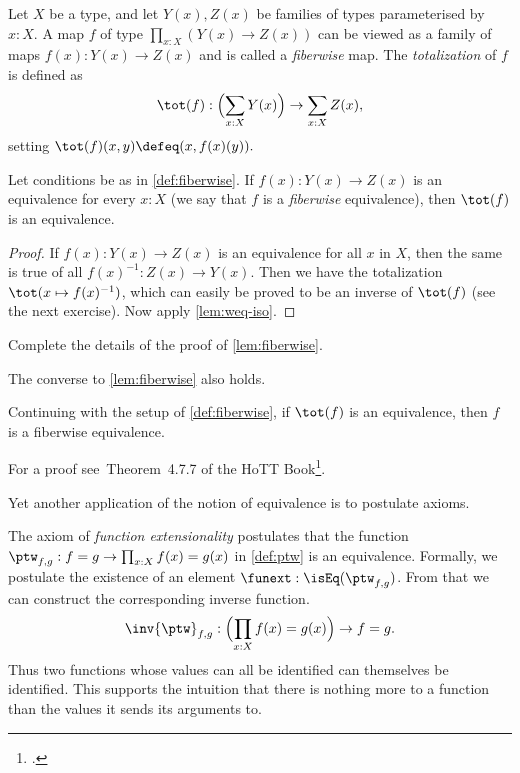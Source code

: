 \begin{definition}\label{def:fiberwise}
Let $X$ be a type, and let $Y(x),Z(x)$ be families of types parameterised
by $x:X$. A map $f$ of type $\prod_{x:X}(Y(x)\to Z(x))$
can be viewed as a family of maps $f(x): Y(x)\to Z(x)$ and is called a
\emph{fiberwise} map. The \emph{totalization} of $f$ is defined as
\[
  \tot(f) : \Bigl(\sum_{x:X} Y(x)\Bigr) \to \sum_{x:X} Z(x),
\]
setting $\tot(f)(x,y)\defeq (x,f(x)(y)).$
\end{definition}

\begin{lemma}\label{lem:fiberwise}
Let conditions be as in \cref{def:fiberwise}.
If $f(x): Y(x) \to Z(x)$ is an equivalence for every $x:X$
(we say that $f$ is a \emph{fiberwise} equivalence),
then $\tot(f)$ is an equivalence.
\end{lemma}

\begin{proof}
If $f(x): Y(x) \to Z(x)$ is an equivalence for all $x$ in $X$,
then the same is true of all $f(x)^{-1}: Z(x) \to Y(x)$.
Then we have the totalization $\tot(x\mapsto f(x)^{-1})$,
which can easily be proved to be an inverse of $\tot(f)$
(see the next exercise). Now apply \cref{lem:weq-iso}.
\end{proof}

\begin{xca}\label{xca:fiberwise}
Complete the details of the proof of \cref{lem:fiberwise}.
\end{xca}

The converse to \cref{lem:fiberwise} also holds.
\begin{lemma}\label{lem:fiberwise-equiv-from-tot}
  Continuing with the setup of \cref{def:fiberwise},
  if $\tot(f)$ is an equivalence, then $f$ is a fiberwise equivalence.
\end{lemma}
For a proof see~Theorem~4.7.7 of the HoTT Book\footcite{hottbook}.

Yet another application of the notion of equivalence is to postulate axioms.

\begin{principle}\label{def:funext}
The axiom of \emph{function extensionality} postulates that the function
$\ptw_{f,g}: f=g \to \prod_{x:X} f(x)=g(x)$ in \cref{def:ptw} is an equivalence.
Formally, we postulate the existence of an element $\funext : \isEq(\ptw_{f,g})$.
From that we can construct the corresponding inverse function.
\[
\inv{\ptw}_{f,g}: \Bigl(\prod_{x:X} f(x)=g(x)\Bigr) \to f=g.
\]
Thus two functions whose values can all be identified can themselves be identified.
This supports the intuition that there is nothing more to a function than the values
it sends its arguments to.
\end{principle}

